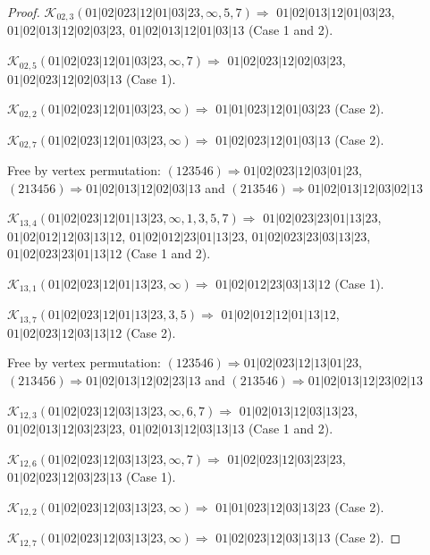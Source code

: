 \documentclass[12pt]{article}
\theoremstyle{plain}
\theoremstyle{definition}
\theoremstyle{remark}
\newcommand{\fancy}[1]{\mathcal{#1}}
\def\K{\fancy{K}}
\begin{document}
\begin{proof}
	
	
	\bigskip
	
	$\K_{02,3}(01|02|023|12|01|03|23,\infty,5, 7)\Rightarrow $ $01|02|013|12|01|03|23$, $01|02|013|12|02|03|23$, $01|02|013|12|01|03|13$ (Case 1 and 2).
	
	$\K_{02,5}(01|02|023|12|01|03|23,\infty,7)\Rightarrow $ $01|02|023|12|02|03|23$, $01|02|023|12|02|03|13$ (Case 1).
	
	$\K_{02,2}(01|02|023|12|01|03|23,\infty)\Rightarrow $ $01|01|023|12|01|03|23$ (Case 2).
	
	$\K_{02,7}(01|02|023|12|01|03|23,\infty)\Rightarrow $ $01|02|023|12|01|03|13$ (Case 2).
	
	
	
	Free by vertex permutation: $(1 2 3 5 4 6)\Rightarrow 01|02|023|12|03|01|23$, $(2 1 3 4 5 6)\Rightarrow 01|02|013|12|02|03|13$ and $(2 1 3 5 4 6)\Rightarrow 01|02|013|12|03|02|13$
	
	
	
	\bigskip
	
	$\K_{13,4}(01|02|023|12|01|13|23,\infty,1, 3, 5, 7)\Rightarrow $ $01|02|023|23|01|13|23$, $01|02|012|12|03|13|12$, $01|02|012|23|01|13|23$, $01|02|023|23|03|13|23$, $01|02|023|23|01|13|12$ (Case 1 and 2).
	
	$\K_{13,1}(01|02|023|12|01|13|23,\infty)\Rightarrow $ $01|02|012|23|03|13|12$ (Case 1).
	
	$\K_{13,7}(01|02|023|12|01|13|23,3, 5)\Rightarrow $ $01|02|012|12|01|13|12$, $01|02|023|12|03|13|12$ (Case 2).
	
	
	
	Free by vertex permutation: $(1 2 3 5 4 6)\Rightarrow 01|02|023|12|13|01|23$, $(2 1 3 4 5 6)\Rightarrow 01|02|013|12|02|23|13$ and $(2 1 3 5 4 6)\Rightarrow 01|02|013|12|23|02|13$
	
	
	
	\bigskip
	
	$\K_{12,3}(01|02|023|12|03|13|23,\infty,6, 7)\Rightarrow $ $01|02|013|12|03|13|23$, $01|02|013|12|03|23|23$, $01|02|013|12|03|13|13$ (Case 1 and 2).
	
	$\K_{12,6}(01|02|023|12|03|13|23,\infty,7)\Rightarrow $ $01|02|023|12|03|23|23$, $01|02|023|12|03|23|13$ (Case 1).
	
	$\K_{12,2}(01|02|023|12|03|13|23,\infty)\Rightarrow $ $01|01|023|12|03|13|23$ (Case 2).
	
	$\K_{12,7}(01|02|023|12|03|13|23,\infty)\Rightarrow $ $01|02|023|12|03|13|13$ (Case 2).
	
	
	

\end{proof}
\end{document}
